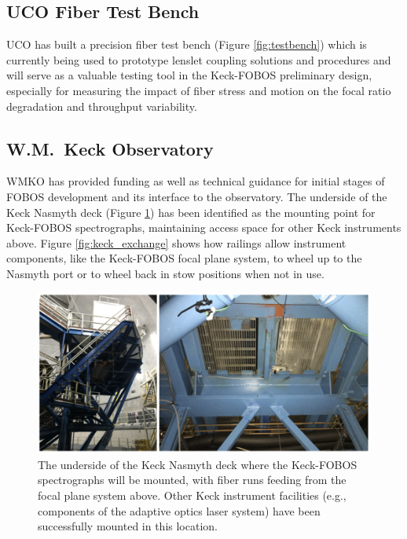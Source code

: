 \documentclass[oneside,11pt]{amsart}
\begin{document}
\subsection{UCO Fiber Test Bench}

UCO has built a precision fiber test bench (Figure \ref{fig:testbench}) which is currently being used to prototype lenslet coupling solutions and procedures and will serve as a valuable testing tool in the Keck-FOBOS preliminary design, especially for measuring the impact of fiber stress and motion on the focal ratio degradation and throughput variability.

\subsection{W.M.\ Keck Observatory}

WMKO has provided funding as well as technical guidance for initial stages of FOBOS development and its interface to the observatory.  The underside of the Keck Nasmyth deck (Figure \ref{fig:nasmyth_mount}) has been identified as the mounting point for Keck-FOBOS spectrographs, maintaining access space for other Keck instruments above.  Figure \ref{fig:keck_exchange} shows how railings allow instrument components, like the Keck-FOBOS focal plane system, to wheel up to the Nasmyth port or to wheel back in stow positions when not in use.


\begin{figure}[h!]
 \vskip -0.1in
 \includegraphics[width=\textwidth]{figs/nasmyth_deck.png}
 \caption{\small The underside of the Keck Nasmyth deck where the Keck-FOBOS spectrographs will be mounted, with fiber runs feeding from the focal plane system above.  Other Keck instrument facilities (e.g., components of the adaptive optics laser system) have been successfully mounted in this location.  }\label{fig:nasmyth_mount}
\end{figure}
\end{document}
